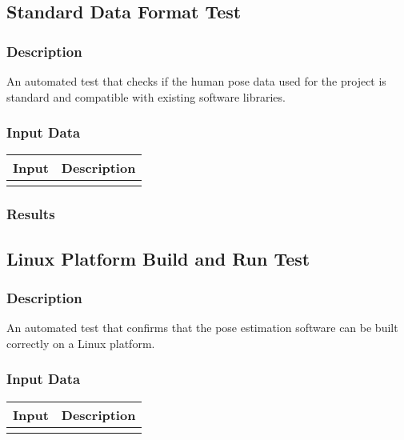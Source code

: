 \documentclass{scrreprt}
\begin{document}
\subsection{Standard Data Format Test}
\subsubsection{Description}
\begin{flushleft}
An automated test that checks if the human pose data used for the project is standard and compatible with existing software libraries.
\end{flushleft}
\subsubsection{Input Data}
 \centering
 \begin{tabular}{p{3cm}p{6cm}}
 \hline\hline
 Input & Description\\
 \hline\hline
   &  \\ %
 \hline
 \end{tabular}
\subsubsection{Results}

\subsection{Linux Platform Build and Run Test}
\subsubsection{Description}
\begin{flushleft}
An automated test that confirms that the pose estimation software can be built correctly on a Linux platform.
\end{flushleft}
\subsubsection{Input Data}
 \centering
 \begin{tabular}{p{3cm}p{6cm}}
 \hline\hline
 Input & Description\\
 \hline\hline
   &  \\ %
 \hline
 \end{tabular}
\end{document}
